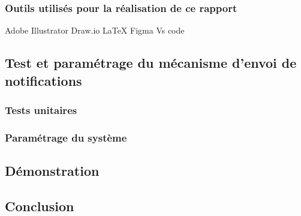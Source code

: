 \subsubsection{Outils utilisés pour la réalisation de ce rapport}
Adobe Illustrator
Draw.io
LaTeX
Figma
Vs code
\subsection{Test et paramétrage du mécanisme d'envoi de notifications}
\subsubsection{Tests unitaires}
\subsubsection{Paramétrage du système}
\subsection{Démonstration}
\subsection*{Conclusion}
